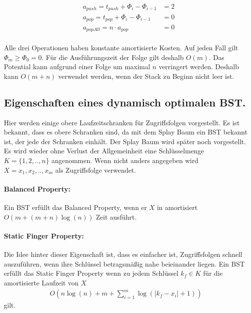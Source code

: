 \documentclass[a4paper,12pt]{article}
\begin{document}
\begin{align*}   
&a_{\mathit{push}} = t_{\mathit{push}} + \Phi_{i} - \Phi_{i-1}  &= 2\\
&a_{\mathit{pop}} = t_{\mathit{pop}} + \Phi_{i} - \Phi_{i-1}  &= 0\\
&a_{\mathit{popAll}} = n \cdot a_{\mathit{pop}} &= 0
\end{align*}\\
Alle drei Operationen haben konstante amortisierte Kosten. Auf jeden Fall gilt $ \Phi_m \geq  \Phi_0 = 0 $. Für die Ausführungszeit der Folge gilt deshalb $O(m)$. Das Potential kann aufgrund einer Folge um maximal $n$ verringert werden. Deshalb kann $O\left(m + n\right)$ verwendet werden, wenn der Stack zu Beginn nicht leer ist.  \\



\subsection{Eigenschaften eines dynamisch optimalen BST. }\label{upperBounds}
Hier werden einige obere Laufzeitschranken für Zugriffsfolgen vorgestellt. Es ist bekannt, dass es obere Schranken sind, da mit dem Splay Baum ein BST bekannt ist, der jede der Schranken einhält. Der Splay Baum wird später noch vorgestellt. Es wird wieder ohne Verlust der Allgemeinheit eine Schlüsselmenge $K = \{1,2,..,n\}$ angenommen. Wenn nicht anders angegeben wird  $X = x_1,x_2,..,x_m$ als Zugriffsfolge verwendet. 


\paragraph{Balanced Property:}
Ein BST erfüllt das Balanced Property, wenn er $X$ in amortisiert $O\left(m + \left(m + n\right) \log \left( n\right)  \right)$ Zeit ausführt. 

\paragraph{Static Finger Property:}
Die Idee hinter dieser Eigenschaft ist, dass es einfacher ist, Zugriffsfolgen schnell auszuführen, wenn ihre Schlüssel betragsmäßig nahe beieinander liegen. Ein BST erfüllt das Static Finger Property wenn zu jedem Schlüssel $k_f \in K$ für die amortisierte Laufzeit von $X$ 
\begin{align*}
O\left( n \log\left( n\right) +m + \sum_{i = 1}^{m} \log \left( \vert k_f - x_i  \vert	+ 1	\right)\right)
\end{align*}
gilt. 
\end{document}
